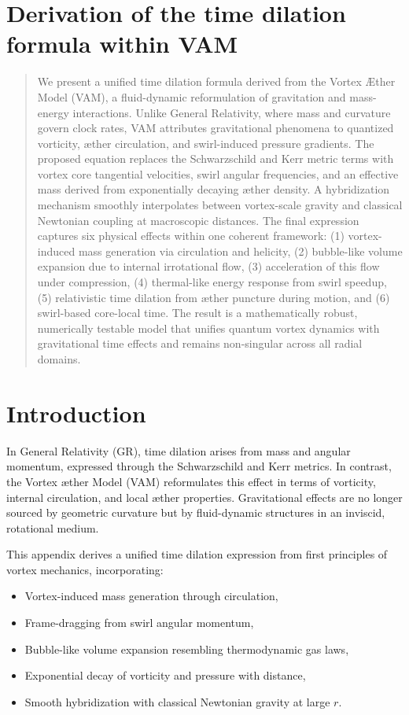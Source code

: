 
\section{Derivation of the time dilation formula within VAM}\label{sec:appendix:1}

\begin{abstract}
We present a unified time dilation formula derived from the Vortex \AE{}ther Model (VAM), a fluid-dynamic reformulation of gravitation and mass-energy interactions. Unlike General Relativity, where mass and curvature govern clock rates, VAM attributes gravitational phenomena to quantized vorticity, æther circulation, and swirl-induced pressure gradients. The proposed equation replaces the Schwarzschild and Kerr metric terms with vortex core tangential velocities, swirl angular frequencies, and an effective mass derived from exponentially decaying æther density. A hybridization mechanism smoothly interpolates between vortex-scale gravity and classical Newtonian coupling at macroscopic distances. The final expression captures six physical effects within one coherent framework: (1) vortex-induced mass generation via circulation and helicity, (2) bubble-like volume expansion due to internal irrotational flow, (3) acceleration of this flow under compression, (4) thermal-like energy response from swirl speedup, (5) relativistic time dilation from æther puncture during motion, and (6) swirl-based core-local time. The result is a mathematically robust, numerically testable model that unifies quantum vortex dynamics with gravitational time effects and remains non-singular across all radial domains.
\end{abstract}

\section*{Introduction}

In General Relativity (GR), time dilation arises from mass and angular momentum, expressed through the Schwarzschild and Kerr metrics. In contrast, the Vortex \ae{}ther Model (VAM) reformulates this effect in terms of vorticity, internal circulation, and local æther properties. Gravitational effects are no longer sourced by geometric curvature but by fluid-dynamic structures in an inviscid, rotational medium.

This appendix derives a unified time dilation expression from first principles of vortex mechanics, incorporating:

\begin{itemize}
    \item Vortex-induced mass generation through circulation,
    \item Frame-dragging from swirl angular momentum,
    \item Bubble-like volume expansion resembling thermodynamic gas laws,
    \item Exponential decay of vorticity and pressure with distance,
    \item Smooth hybridization with classical Newtonian gravity at large \( r \).
\end{itemize}


